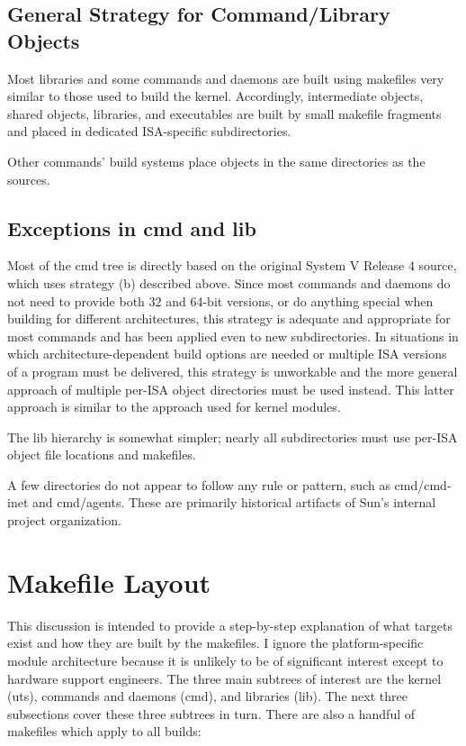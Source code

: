 \documentclass{article}
\begin{document}
\subsection*{General Strategy for Command/Library Objects}

Most libraries and some commands and daemons are built using makefiles very
similar to those used to build the kernel. Accordingly, intermediate objects,
shared objects, libraries, and executables are built by small makefile
fragments and placed in dedicated ISA-specific subdirectories.\vspace{0.2cm}

Other commands' build systems place objects in the same directories as the
sources.

\subsection*{Exceptions in cmd and lib}

Most of the cmd tree is directly based on the original System V Release 4
source, which uses strategy (b) described above. Since most commands and
daemons do not need to provide both 32 and 64-bit versions, or do anything
special when building for different architectures, this strategy is adequate
and appropriate for most commands and has been applied even to new
subdirectories. In situations in which architecture-dependent build options are
needed or multiple ISA versions of a program must be delivered, this strategy
is unworkable and the more general approach of multiple per-ISA object
directories must be used instead. This latter approach is similar to the
approach used for kernel modules.

The lib hierarchy is somewhat simpler; nearly all subdirectories must use
per-ISA object file locations and makefiles.

A few directories do not appear to follow any rule or pattern, such as
cmd/cmd-inet and cmd/agents. These are primarily historical artifacts of Sun's
internal project organization.

\section*{Makefile Layout}

This discussion is intended to provide a step-by-step explanation of what
targets exist and how they are built by the makefiles. I ignore the
platform-specific module architecture because it is unlikely to be of
significant interest except to hardware support engineers. The three main
subtrees of interest are the kernel (uts), commands and daemons (cmd), and
libraries (lib). The next three subsections cover these three subtrees in
turn. There are also a handful of makefiles which apply to all builds:
\end{document}
